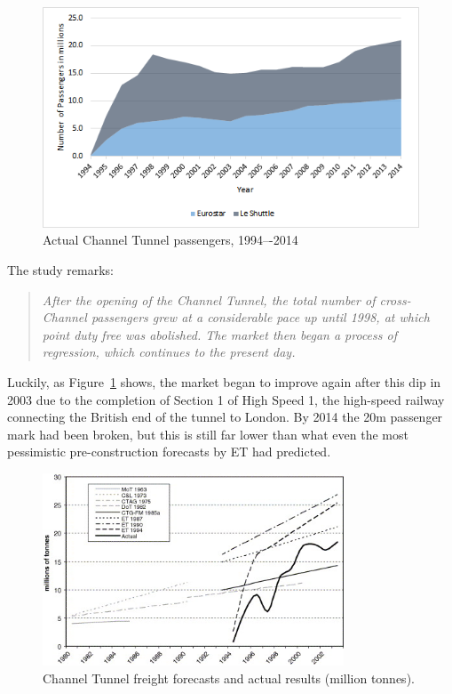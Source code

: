 \documentclass[12pt]{article} %
\begin{document}
\begin{figure}[htp]
  \centering
  \includegraphics[width=\textwidth]{pass-new}
  \caption{Actual Channel Tunnel passengers, 1994–-2014}
  \label{fig:pass-new}
\end{figure}

The study remarks:
\begin{quote}
\textit{After the opening of the Channel Tunnel, the total number of cross-Channel passengers grew at a considerable pace up until 1998, at which point duty free was abolished. The market then began a process of regression, which continues to the present day.}
\end{quote}

Luckily, as Figure~\ref{fig:pass-new} shows, the market began to improve again after this dip in 2003 due to the completion of Section 1 of High Speed 1, the high-speed railway connecting the British end of the tunnel to London. By 2014 the 20m passenger mark had been broken, but this is still far lower than what even the most pessimistic pre-construction forecasts by ET had predicted.

\begin{figure}[htp]
  \centering
  \includegraphics[width=0.8\textwidth]{freight}
  \caption{Channel Tunnel freight forecasts and actual results (million tonnes).}
  \label{fig:freight-fore}
\end{figure}
\end{document}
